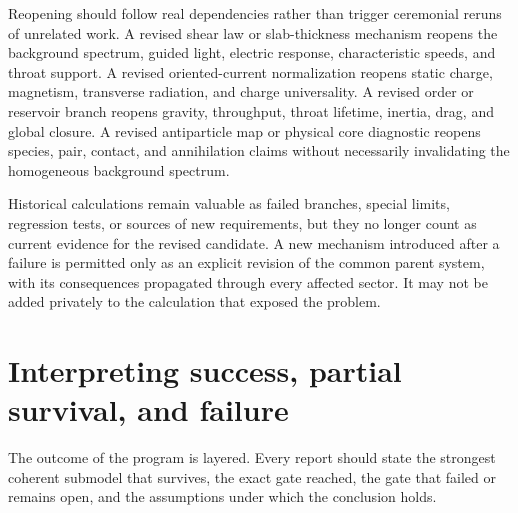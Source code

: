 Reopening should follow real dependencies rather than trigger ceremonial reruns
of unrelated work. A revised shear law or slab-thickness mechanism reopens the
background spectrum, guided light, electric response, characteristic speeds,
and throat support. A revised oriented-current normalization reopens static
charge, magnetism, transverse radiation, and charge universality. A revised
order or reservoir branch reopens gravity, throughput, throat lifetime, inertia,
drag, and global closure. A revised antiparticle map or physical core diagnostic
reopens species, pair, contact, and annihilation claims without necessarily
invalidating the homogeneous background spectrum.

Historical calculations remain valuable as failed branches, special limits,
regression tests, or sources of new requirements, but they no longer count as
current evidence for the revised candidate. A new mechanism introduced after a
failure is permitted only as an explicit revision of the common parent system,
with its consequences propagated through every affected sector. It may not be
added privately to the calculation that exposed the problem.

\section{Interpreting success, partial survival, and failure}

The outcome of the program is layered. Every report should state the strongest
coherent submodel that survives, the exact gate reached, the gate that failed or
remains open, and the assumptions under which the conclusion holds.


